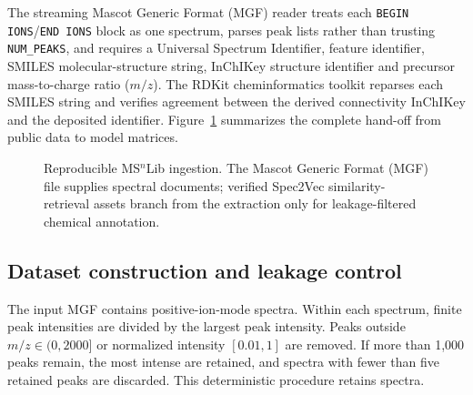 \documentclass[10pt,a4paper]{article}
\begin{document}
The streaming Mascot Generic Format (MGF) reader treats each
\texttt{BEGIN IONS}/\texttt{END IONS} block as one spectrum, parses peak lists
rather than trusting \texttt{NUM\_PEAKS}, and requires a Universal Spectrum
Identifier, feature identifier, SMILES molecular-structure string, InChIKey
structure identifier and precursor mass-to-charge ratio ($m/z$). The RDKit
cheminformatics toolkit reparses each SMILES string and verifies agreement
between the derived connectivity InChIKey and the deposited identifier.
Figure~\ref{fig:data-pipeline} summarizes the complete hand-off from public data
to model matrices.

\begin{figure}[H]
\centering
{}
\caption{Reproducible MS$^{n}$Lib ingestion. The Mascot Generic Format (MGF)
file supplies spectral documents; verified Spec2Vec similarity-retrieval assets
branch from the extraction only for leakage-filtered chemical annotation.}
\label{fig:data-pipeline}
\end{figure}

\subsection{Dataset construction and leakage control}

The input MGF contains \SourceSpectra{} positive-ion-mode spectra. Within each
spectrum, finite peak intensities are divided by the largest peak intensity.
Peaks outside $m/z\in(0,2000]$ or normalized intensity $[0.01,1]$ are removed.
If more than 1,000 peaks remain, the most intense are retained, and spectra with
fewer than five retained peaks are discarded. This deterministic procedure
retains \RetainedSpectra{} spectra.
\end{document}
